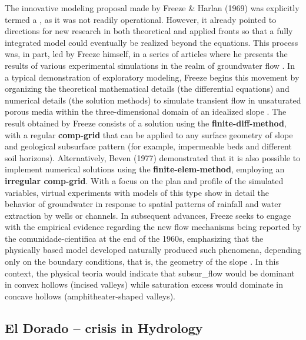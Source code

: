 \documentclass[./main_en.tex]{subfiles}
\begin{document}
\par The innovative modeling proposal made by Freeze \& Harlan (1969) was explicitly termed a , as it was not readily operational. However, it already pointed to directions for new research in both theoretical and applied fronts so that a fully integrated \gls{model} could eventually be realized beyond the equations. This process was, in part, led by Freeze himself, in a series of articles where he presents the results of various experimental simulations in the realm of groundwater flow \cite{Freeze1974a}. In a typical demonstration of exploratory modeling, Freeze begins this movement by organizing the theoretical mathematical details (the differential equations) and numerical details (the solution methods) to simulate transient flow in unsaturated porous media within the three-dimensional domain of an idealized slope \cite{Freeze1971a}. The result obtained by Freeze consists of a solution using the \textbf{\gls{finite-diff-method}}, with a regular \textbf{\gls{comp-grid}} that can be applied to any surface geometry of slope and geological subsurface pattern (for example, impermeable beds and different soil horizons). Alternatively, Beven (1977) \cite{Beven1977a} demonstrated that it is also possible to implement numerical solutions using the \textbf{\gls{finite-elem-method}}, employing an \textbf{irregular \gls{comp-grid}}. With a focus on the plan and profile of the simulated variables, virtual experiments with models of this type show in detail the behavior of groundwater in response to spatial patterns of rainfall and water extraction by wells or channels. In subsequent advances, Freeze seeks to engage with the empirical evidence regarding the new flow mechanisms being reported by the \gls{comunidade-cientifica} at the end of the 1960s, emphasizing that the physically based \gls{model} developed naturally produced such phenomena, depending only on the boundary conditions, that is, the geometry of the slope \cite{Freeze1972a, Freeze1972b}. In this context, the physical \gls{teoria} would indicate that \gls{subsur_flow} would be dominant in convex \gls{hollows} (incised valleys) while saturation excess would dominate in concave \gls{hollows} (amphitheater-shaped valleys). 

\subsection{El Dorado -- crisis in Hydrology} \label{sec:hydro:broken}
\end{document}
